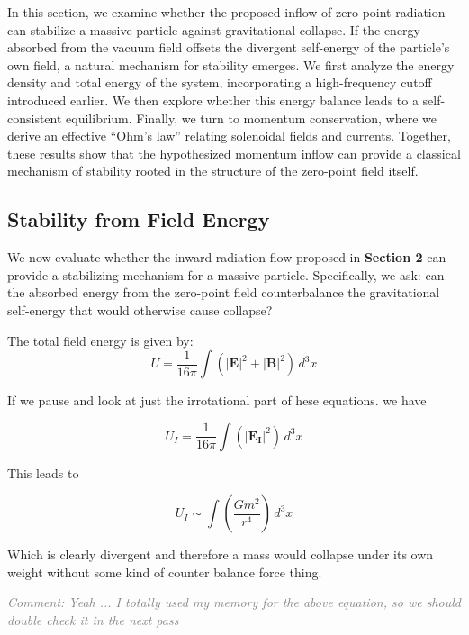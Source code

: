 \documentclass {article}
\renewcommand\vec{\mathbf}
\newcommand{\comment}[1]{\textcolor{gray}{\small\textit{Comment: #1}}}
\begin{document}
In this section, we examine whether the proposed inflow of zero-point radiation can stabilize a massive particle against gravitational collapse. If the energy absorbed from the vacuum field offsets the divergent self-energy of the particle’s own field, a natural mechanism for stability emerges. We first analyze the energy density and total energy of the system, incorporating a high-frequency cutoff introduced earlier. We then explore whether this energy balance leads to a self-consistent equilibrium. Finally, we turn to momentum conservation, where we derive an effective “Ohm’s law” relating solenoidal fields and currents. Together, these results show that the hypothesized momentum inflow can provide a classical mechanism of stability rooted in the structure of the zero-point field itself.

\subsection{Stability from Field Energy}

We now evaluate whether the inward radiation flow proposed in \textbf{Section 2} can provide a stabilizing mechanism for a massive particle. Specifically, we ask: can the absorbed energy from the zero-point field counterbalance the gravitational self-energy that would otherwise cause collapse?

The total field energy is given by:
\begin{equation}
U = \frac{1}{16\pi} \int \left( |\vec{E}|^2 + |\vec{B}|^2 \right) \, d^3x
\end{equation}

If we pause and look at just the irrotational part of hese equations. we have

\begin{equation}
U_I = \frac{1}{16\pi} \int \left( |\vec{E_I}|^2  \right) \, d^3x
\end{equation}

This leads to 

\begin{equation}
U_I\sim \int \left(\frac { Gm^2} {r^4} \right) \, d^3x
\end{equation}

Which is clearly divergent and therefore a mass would collapse under its own weight without some kind of counter balance force thing.

\comment{Yeah ... I totally used my memory for the above equation, so we should double check it in the next pass}
\end{document}
